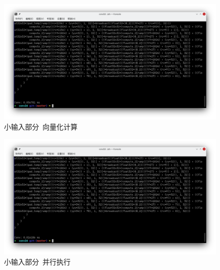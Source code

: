 \begin{figure}[H]
    \includegraphics[width=\textwidth]{images/orig-3.png}
    \caption{小输入部分~向量化计算}\label{1-3}
\end{figure}

\begin{figure}[H]
    \includegraphics[width=\textwidth]{images/orig-4.png}
    \caption{小输入部分~并行执行}\label{1-4}
\end{figure}

